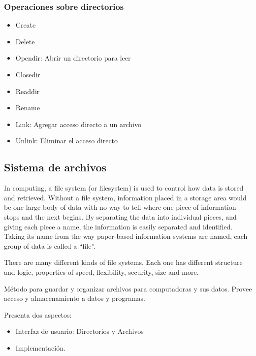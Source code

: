 \documentclass[a4paper, twoside]{article}
\begin{document}
\subsubsection{Operaciones sobre directorios}
\begin{itemize}
	\item Create
	\item Delete
	\item Opendir: Abrir un directorio para leer
	\item Closedir
	\item Readdir
	\item Rename
	\item Link: Agregar acceso directo a un archivo
	\item Unlink: Eliminar el acceso directo
\end{itemize}

\subsection{Sistema de archivos}
In computing, a file system (or filesystem) is used to control how data is stored and retrieved. Without a file system, information placed in a storage area would be one large body of data with no way to tell where one piece of information stops and the next begins. By separating the data into individual pieces, and giving each piece a name, the information is easily separated and identified. Taking its name from the way paper-based information systems are named, each group of data is called a ``file''. 

There are many different kinds of file systems. Each one has different structure and logic, properties of speed, flexibility, security, size and more.

Método para guardar y organizar archivos para computadoras y sus datos. Provee acceso y almacenamiento a datos y programas.

Presenta dos aspectos:
\begin{itemize}
	\item Interfaz de usuario: Directorios y Archivos
	\item Implementación.
\end{itemize}
\end{document}
